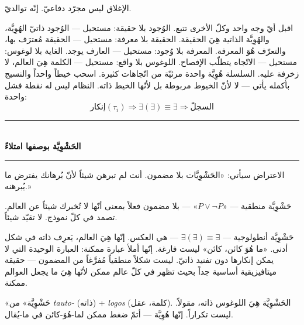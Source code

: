 \documentclass[10pt, openany, oneside]{book}
\renewcommand{\normalsize}{\fontsize{10}{13}\selectfont}
\begin{document}
\vspace{1em}

\noindent الإغلاق ليس مجرّد دفاعيّ. إنّه توالديّ.

اقبل أيّ وجه واحد وكلّ الأخرى تتبع. الوُجود بلا حقيقة: مستحيل --- الوُجود ذاتيّ الهُوِيَّة، والهُوِيَّة الذاتية هِيَ الحقيقة. الحقيقة بلا معرفة: مستحيل --- الحقيقة مُعترَف بها، والتعرّف هُوَ المعرفة. المعرفة بلا وُجود: مستحيل --- العارف يوجد. الغاية بلا لوغوس: مستحيل --- الاتّجاه يتطلّب الإفصاح. اللوغوس بلا واقع: مستحيل --- الكلمة هِيَ العالم، لا زخرفة عليه. السلسلة هُوِيَّة واحدة مرئيّة من اتّجاهات كثيرة. اسحب خيطاً واحداً والنسيج بأكمله يأتي --- لا لأنّ الخيوط مربوطة بل لأنّها الخيط ذاته. النظام ليس له نقطة فشل واحدة:
$$\text{إنكار}(\tau_i) \Rightarrow \exists(\exists) \equiv \exists \Rightarrow \text{السجلّ}$$

\vspace{1.5em}


\begin{center}
    \rule{0.3\textwidth}{0.4pt}\\[0.5em]
    {\normalsize\bfseries الحَشْوِيَّة بوصفها امتلاءً}\\[0.3em]
    \rule{0.3\textwidth}{0.4pt}
\end{center}

\vspace{1em}

\noindent الاعتراض سيأتي: «الحَشْوِيَّات بلا مضمون. أنت لم تبرهن شيئاً لأنّ بُرهانك يفترض ما يُبرهنه.»

حَشْوِيَّة منطقية --- «$P \vee \neg P$» --- بلا مضمون فعلاً بمعنى أنّها لا تُخبرك شيئاً عن العالم. تصمد في كلّ نموذج. لا تقيّد شيئاً.

حَشْوِيَّة أنطولوجية --- $\exists(\exists) \equiv \exists$ --- هي العكس. إنّها هِيَ العالم، يَعرِف ذاته في شكل أدنى. «ما هُوَ كائن، كائن» ليست فارغة. إنّها أملأ عبارة ممكنة: العبارة الوحيدة التي لا يمكن إنكارها دون تفنيد ذاتيّ. ليست شكلاً منطقياً مُفرَّغاً من المضمون --- حقيقة ميتافيزيقية أساسية جداً بحيث تظهر في كلّ عالم ممكن لأنّها هِيَ ما يجعل العوالم ممكنة.

«حَشْوِيَّة» من \textit{tauto-} (ذاته) + \textit{logos} (كلمة، عقل). الحَشْوِيَّة هِيَ اللوغوس ذاته، مقولاً. ليست تكراراً. إنّها هُوِيَّة --- أتمّ ضغط ممكن لما-هُوَ-كائن في ما-يُقال.

\vspace{1.5em}
\end{document}
